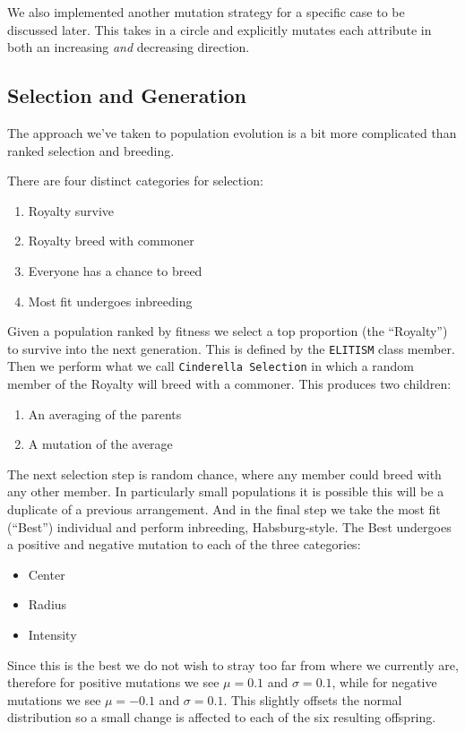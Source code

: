 \documentclass[12pt]{article}
\begin{document}
We also implemented another mutation strategy for a specific case to be discussed later. This takes in a circle and explicitly mutates each attribute in both an increasing \textit{and} decreasing direction.


\subsection*{Selection and Generation}
The approach we've taken to population evolution is a bit more complicated than ranked selection and breeding. 

There are four distinct categories for selection:
\begin{enumerate}
    \item Royalty survive
    \item Royalty breed with commoner
    \item Everyone has a chance to breed
    \item Most fit undergoes inbreeding
\end{enumerate}

Given a population ranked by fitness we select a top proportion (the ``Royalty'') to survive into the next generation. This is defined by the \texttt{ELITISM} class member. Then we perform what we call \texttt{Cinderella Selection} in which a random member of the Royalty will breed with a commoner. This produces two children:
\begin{enumerate}
    \item An averaging of the parents
    \item A mutation of the average
\end{enumerate}

The next selection step is random chance, where any member could breed with any other member. In particularly small populations it is possible this will be a duplicate of a previous arrangement. And in the final step we take the most fit (``Best'') individual and perform inbreeding, Habsburg-style. The Best undergoes a positive and negative mutation to each of the three categories:
\begin{itemize}
    \item Center
    \item Radius
    \item Intensity
\end{itemize}

Since this is the best we do not wish to stray too far from where we currently are, therefore for positive mutations we see $\mu = 0.1$ and $\sigma = 0.1$, while for negative mutations we see $\mu = -0.1$ and $\sigma = 0.1$. This slightly offsets the normal distribution so a small change is affected to each of the six resulting offspring.
\end{document}
